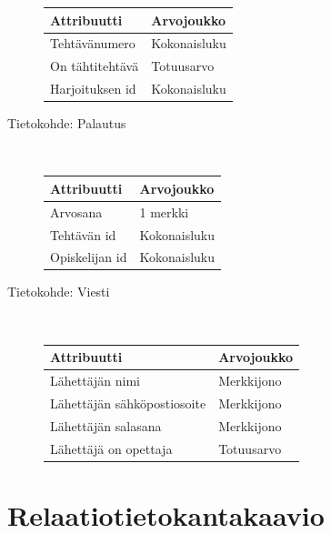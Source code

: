 \documentclass[a4paper,12pt, titlepage]{article}
\begin{document}
\begin{description}
	\begin{tabular}{| l | l |}
	\hline
	Attribuutti & Arvojoukko \\ \hline
	Tehtävänumero & Kokonaisluku \\ \hline
	On tähtitehtävä & Totuusarvo \\ \hline
	Harjoituksen id & Kokonaisluku \\ \hline
	\end{tabular}
	\item[Tietokohde: Palautus] \hfill \\
	\begin{tabular}{| l | l |}
	\hline
	Attribuutti & Arvojoukko \\ \hline
	Arvosana & 1 merkki \\ \hline
	Tehtävän id & Kokonaisluku \\ \hline
	Opiskelijan id & Kokonaisluku \\ \hline
	\end{tabular}
	\item[Tietokohde: Viesti] \hfill \\
	\begin{tabular}{| l | l |}
	\hline
	Attribuutti & Arvojoukko \\ \hline
	Lähettäjän nimi & Merkkijono \\ \hline
	Lähettäjän sähköpostiosoite & Merkkijono \\ \hline
	Lähettäjän salasana & Merkkijono \\ \hline
	Lähettäjä on opettaja & Totuusarvo \\ \hline
	\end{tabular}
\end{description}

\section{Relaatiotietokantakaavio}
\end{document}

